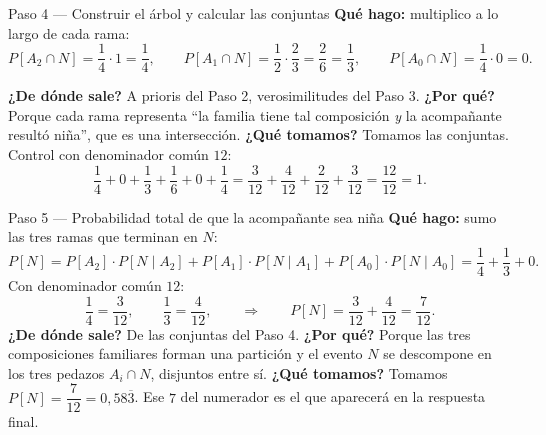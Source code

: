 \documentclass[11pt]{article}
\begin{document}
\begin{sol}
\begin{paso}{Paso 4 --- Construir el \'arbol y calcular las conjuntas}
\textbf{Qu\'e hago:} multiplico a lo largo de cada rama:
\[
P[A_2\cap N]=\frac14\cdot 1=\frac14,
\qquad
P[A_1\cap N]=\frac12\cdot\frac23=\frac{2}{6}=\frac13,
\qquad
P[A_0\cap N]=\frac14\cdot 0=0 .
\]

\begin{center}
\shorthandoff{<>}
\shorthandon{<>}
\end{center}

\textbf{¿De d\'onde sale?} A prioris del Paso 2, verosimilitudes del Paso 3.
\textbf{¿Por qu\'e?} Porque cada rama representa ``la familia tiene tal composici\'on \emph{y} la acompa\~nante result\'o ni\~na'', que es una intersecci\'on.
\textbf{¿Qu\'e tomamos?} Tomamos las conjuntas. Control con denominador com\'un $12$:
\[
\frac14+0+\frac13+\frac16+0+\frac14=\frac{3}{12}+\frac{4}{12}+\frac{2}{12}+\frac{3}{12}=\frac{12}{12}=1 .
\]
\end{paso}

\begin{paso}{Paso 5 --- Probabilidad total de que la acompa\~nante sea ni\~na}
\textbf{Qu\'e hago:} sumo las tres ramas que terminan en $N$:
\[
P[N]=P[A_2]\cdot P[N\mid A_2]+P[A_1]\cdot P[N\mid A_1]+P[A_0]\cdot P[N\mid A_0]
=\frac14+\frac13+0 .
\]
Con denominador com\'un $12$:
\[
\frac14=\frac{3}{12},\qquad \frac13=\frac{4}{12},
\qquad\Longrightarrow\qquad
P[N]=\frac{3}{12}+\frac{4}{12}=\frac{7}{12}.
\]
\textbf{¿De d\'onde sale?} De las conjuntas del Paso 4.
\textbf{¿Por qu\'e?} Porque las tres composiciones familiares forman una partici\'on y el evento $N$ se descompone en los tres pedazos $A_i\cap N$, disjuntos entre s\'i.
\textbf{¿Qu\'e tomamos?} Tomamos $P[N]=\dfrac{7}{12}=0{,}58\overline{3}$. Ese $7$ del numerador es el que aparecer\'a en la respuesta final.
\end{paso}


\end{sol}
\end{document}
